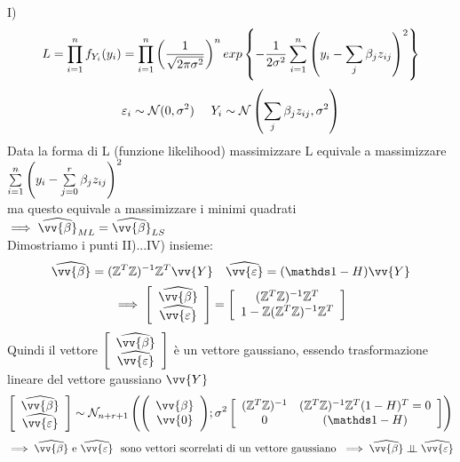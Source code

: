 \begin{Dim}
I)
    \[
    L=\prod\limits_{i=1}^{n} f_{Y_i}(y_i) = \prod\limits_{i=1}^{n} \left(\dfrac{1}{\sqrt{2\pi \sigma^2}}\right)^n exp \left\{ -\dfrac{1}{2\sigma^2}\sum\limits_{i=1}^{n} \left( y_i - \sum_j \beta_jz_{ij}\right)^2 \right\}
    \]
    \[
    \eps_i \sim \Nc(0,\sigma^2) \ \ \ \ Y_i \sim \Nc \O\sum_j\beta_jz_{ij}, \sigma^2 \C
    \]
    Data la forma di L (funzione likelihood) massimizzare L equivale a massimizzare $\sum\limits_{i=1}^{n} \left( y_i - \sum\limits_{j=0}^{r} \beta_j z_{ij}\right)^2$\\ ma questo equivale a massimizzare i minimi quadrati $\implies \hat{\vv{\beta}}_{ML} = \hat{\vv{\beta}}_{LS}$\\

    Dimostriamo i punti II)...IV) insieme:
    \[
    \hat{\vv{\beta}}=(\ZZ^T\ZZ)^{-1}\ZZ^T\vv{Y} \ \ \ \hat{\vv{\eps}} = (\II-H)\vv{Y}
    \]
    \[
    \implies \OO\begin{array}{c}
        \hat{\vv{\beta}}  \\
          \hat{\vv{\eps}}
    \end{array}\CC = \OO\begin{array}{c}
         (\ZZ^T\ZZ)^{-1}\ZZ^T \\
          1- \ZZ (\ZZ^T\ZZ)^{-1}\ZZ^T
    \end{array}\CC
    \]
    Quindi il vettore $\OO\begin{array}{c}
        \hat{\vv{\beta}}  \\
          \hat{\vv{\eps}}
    \end{array}\CC$ è un vettore gaussiano, essendo trasformazione lineare del vettore gaussiano $\vv{Y}$
    \[
    \OO\begin{array}{c}
        \hat{\vv{\beta}}  \\
          \hat{\vv{\eps}}
    \end{array}\CC \sim \Nc_{n+r+1} \O \Bigg(\begin{array}{c}
       \vv{\beta}  \\
          \vv{0}
    \end{array}\Bigg) ; \sigma^2 \OO\begin{array}{cc}
        (\ZZ^T\ZZ)^{-1} & (\ZZ^T\ZZ)^{-1}\ZZ^T(1-H)^T =0  \\
         0  & (\II-H)
    \end{array}\CC \C
    \]
    \[
    \implies \hat{\vv{\beta}} \text{ e } \hat{\vv{\eps}} \ \text{ sono vettori scorrelati di un vettore gaussiano } \implies \hat{\vv{\beta}} \ind \hat{\vv{\eps}} 
    \]
    \phantom{}


\end{Dim}

